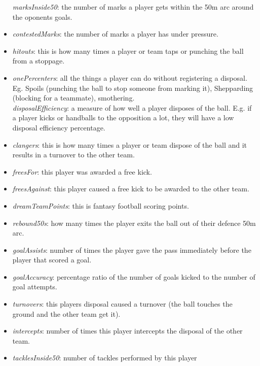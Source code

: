 \begin{itemize}
  \emph{marksInside50}: the number of marks a player gets within the 50m
  arc around the oponents goals.\\
\item
  \emph{contestedMarks}: the number of marks a player has under
  pressure.
\item
  \emph{hitouts}: this is how many times a player or team taps or
  punching the ball from a stoppage.
\item
  \emph{onePercenters}: all the things a player can do without
  registering a disposal. Eg. Spoils (punching the ball to stop someone
  from marking it), Shepparding (blocking for a teammate), smothering.\\
  \emph{disposalEfficiency}: a measure of how well a player disposes of
  the ball. E.g. if a player kicks or handballs to the opposition a lot,
  they will have a low disposal efficiency percentage.\\
\item
  \emph{clangers}: this is how many times a player or team dispose of
  the ball and it results in a turnover to the other team.\\
\item
  \emph{freesFor}: this player was awarded a free kick.\\
\item
  \emph{freesAgainst}: this player caused a free kick to be awarded to
  the other team.\\
\item
  \emph{dreamTeamPoints}: this is fantasy football scoring points.\\
\item
  \emph{rebound50s}: how many times the player exits the ball out of
  their defence 50m arc.\\
\item
  \emph{goalAssists}: number of times the player gave the pass
  immediately before the player that scored a goal.
\item
  \emph{goalAccuracy}: percentage ratio of the number of goals kicked to
  the number of goal attempts.\\
\item
  \emph{turnovers}: this players disposal caused a turnover (the ball
  touches the ground and the other team get it).\\
\item
  \emph{intercepts}: number of times this player intercepts the disposal
  of the other team.
\item
  \emph{tacklesInside50}: number of tackles performed by this player

\end{itemize}
